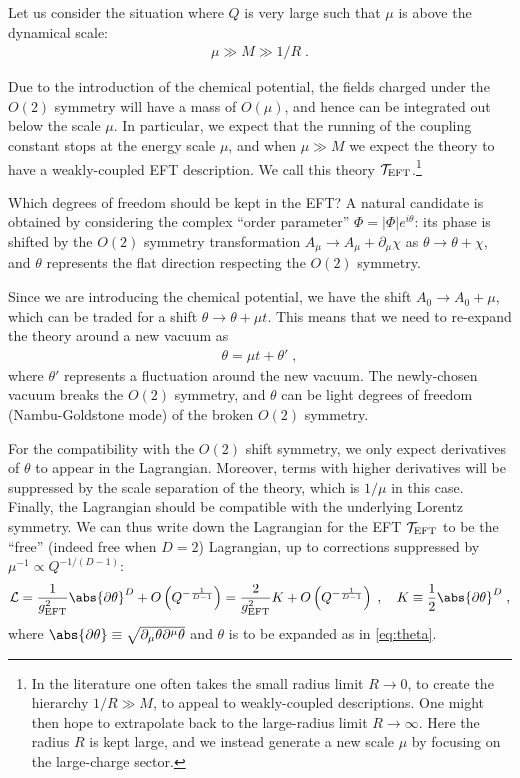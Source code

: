 \documentclass[12pt]{article}
\begin{document}
Let us consider the situation where $Q$ is very large such that $\mu$ is above the dynamical scale:
\begin{align}
\mu \gg M  \gg 1/R \;.
\end{align}

Due to the introduction of the chemical potential, the fields charged under the $O(2)$ symmetry
will
have a mass of $O(\mu)$, and hence can be integrated out below the scale $\mu$. In particular, 
we expect that the running of the coupling constant stops at the energy scale $\mu$, and 
when $\mu\gg M$ we expect the theory to have a weakly-coupled EFT description. We call this theory $\mathcal{T}_{\rm EFT}$.\footnote{In the literature one often takes the small radius  limit $R\to 0$, to create the hierarchy $1/R\gg M$, to appeal to weakly-coupled descriptions. One might then hope to extrapolate back to the large-radius limit $R\to \infty$. Here the radius $R$ is kept large, and we instead generate a new scale $\mu$ by 
focusing on the large-charge sector.} 

Which degrees of freedom should be kept in the EFT? A natural candidate is obtained by considering the complex
``order parameter'' $\Phi = |\Phi| e^{i\theta}$: its phase is shifted by the $O(2)$ symmetry  transformation
$A_{\mu}\to A_{\mu} + \partial_{\mu} \chi$ 
as $\theta\to \theta + \chi$, and $\theta$ represents the flat direction respecting the $O(2)$ symmetry.

Since we are introducing the chemical potential, we have 
the shift $A_0\to A_0 + \mu$, which can be traded for a shift $\theta\to \theta + \mu t$.
This means that we need to re-expand the theory around a new vacuum as
\begin{align}
\theta=\mu t + \theta' \;,
\label{eq:theta}
\end{align}
where $\theta'$ represents a fluctuation around the new vacuum.
The newly-chosen vacuum breaks the $O(2)$ symmetry, and 
$\theta$ can be light degrees of freedom (Nambu-Goldstone mode) of the broken $O(2)$ symmetry.

For the compatibility with the $O(2)$ shift symmetry,
we only expect derivatives of $\theta$ to appear in the Lagrangian.
Moreover, terms with higher derivatives will be suppressed by the 
scale separation of the theory, which is $1/\mu$ in this case.
Finally, the Lagrangian should be compatible with the underlying Lorentz symmetry.
We can thus write down the Lagrangian for the EFT $\mathcal{T}_{\rm EFT}$ to
be the ``free'' (indeed free when $D=2$) Lagrangian, up to corrections suppressed by $\mu^{-1} \propto Q^{-1/(D-1)}$:
\begin{align}
    \mathcal{L} = \frac{1}{g_{\rm EFT}^2}\abs{\partial \theta}^D+O\left(Q^{-\frac{1}{D-1}}\right) = \frac{2}{g_{\rm EFT}^2} K +O\left(Q^{-\frac{1}{D-1}}\right)\;,
    \quad K\equiv \frac{1}{2}\abs{\partial \theta}^D \;,
\end{align}
where $\abs{\partial \theta}\equiv \sqrt{\partial_\mu\theta\partial^\mu \theta}$ and $\theta$ is to be expanded as in \eqref{eq:theta}.
\end{document}
